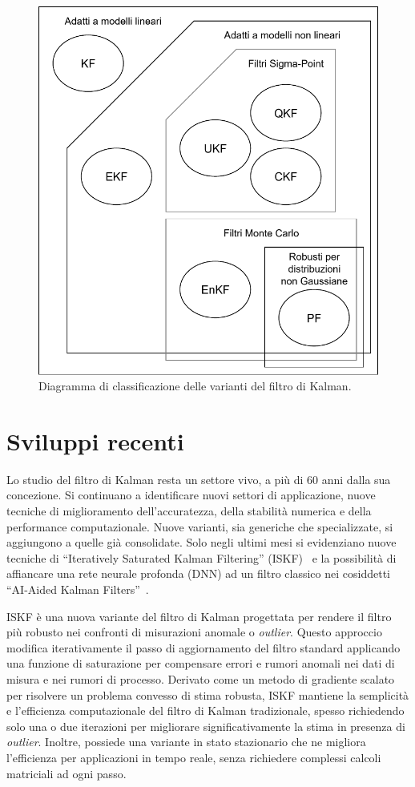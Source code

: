 \documentclass[12pt,a4paper,openright,twoside]{book}
\begin{document}
\begin{figure}
    \centering
    \includegraphics[width=.7\linewidth]{figures/variants-diagram.pdf}
    \caption{Diagramma di classificazione delle varianti del filtro di Kalman.}
    \label{fig:variants-diagram}
    \vspace{2\baselineskip}
\end{figure}

\section{Sviluppi recenti}

Lo studio del filtro di Kalman resta un settore vivo, a più di 60 anni dalla sua concezione. Si continuano a identificare nuovi settori di applicazione, nuove tecniche di miglioramento dell'accuratezza, della stabilità numerica e della performance computazionale. Nuove varianti, sia generiche che specializzate, si aggiungono a quelle già consolidate. Solo negli ultimi mesi si evidenziano nuove tecniche di ``Iteratively Saturated Kalman Filtering'' (ISKF)~\cite{yang2025} e la possibilità di affiancare una rete neurale profonda (DNN) ad un filtro classico nei cosiddetti ``AI-Aided Kalman Filters''~\cite{shlezinger2025}.

ISKF è una nuova variante del filtro di Kalman progettata per rendere il filtro più robusto nei confronti di misurazioni anomale o \textit{outlier}. Questo approccio modifica iterativamente il passo di aggiornamento del filtro standard applicando una funzione di saturazione per compensare errori e rumori anomali nei dati di misura e nei rumori di processo. Derivato come un metodo di gradiente scalato per risolvere un problema convesso di stima robusta, ISKF mantiene la semplicità e l'efficienza computazionale del filtro di Kalman tradizionale, spesso richiedendo solo una o due iterazioni per migliorare significativamente la stima in presenza di \textit{outlier}. Inoltre, possiede una variante in stato stazionario che ne migliora l'efficienza per applicazioni in tempo reale, senza richiedere complessi calcoli matriciali ad ogni passo.
\end{document}
